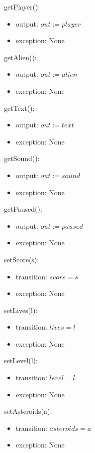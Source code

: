 \documentclass[12pt]{article}
\begin{document}
getPlayer():
\begin{itemize}
    \item output: $out := player$
    \item exception: None
\end{itemize}

getAlien():
\begin{itemize}
    \item output: $out := alien$
    \item exception: None
\end{itemize}

getText():
\begin{itemize}
    \item output: $out := text$
    \item exception: None
\end{itemize}

getSound():
\begin{itemize}
    \item output: $out := sound$
    \item exception: None
\end{itemize}

getPaused():
\begin{itemize}
    \item output: $out := paused$
    \item exception: None
\end{itemize}

setScore(s):
\begin{itemize}
    \item transition: $score = s$
    \item exception: None
\end{itemize}

setLives(l):
\begin{itemize}
    \item transition: $lives = l$
    \item exception: None
\end{itemize}

setLevel(l):
\begin{itemize}
    \item transition: $level = l$
    \item exception: None
\end{itemize}

setAsteroids(a):
\begin{itemize}
    \item transition: $asteroids = a$
    \item exception: None
\end{itemize}
\end{document}
